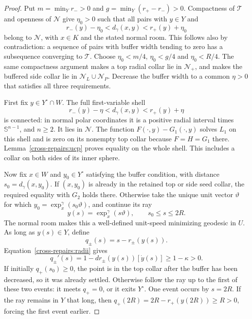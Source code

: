 \documentclass[11pt]{article}
\theoremstyle{definition}
\theoremstyle{remark}
\numberwithin{equation}{section}
\begin{document}
\begin{proof}
Put $m=\min_Yr_->0$ and $g=\min_Y(r_+-r_-)>0$.
Compactness of $\mathcal T$ and openness of $\mathcal N$ give
$\eta_0>0$ such that all pairs with $y\in Y$ and
\begin{equation}\label{cross-repairs:buffer}
 r_-(y)-\eta_0<d_\gamma(x,y)<r_+(y)+\eta_0
\end{equation}
belong to $\mathcal N$, with $x\in K$ and the stated normal room.
This follows also by contradiction: a sequence of pairs with buffer
width tending to zero has a subsequence converging to $\mathcal T$.
Choose $\eta_0<m/4$, $\eta_0<g/4$ and $\eta_0<R/4$.
The same compactness argument makes a top radial collar lie in
$\mathcal N_+$, and makes the buffered side collar lie in
$\mathcal N_L\cup\mathcal N_P$. Decrease the buffer width to a common
$\eta>0$ that satisfies all three requirements.

First fix $y\in Y^\circ\cap W$. The full first-variable shell
\[
 r_-(y)-\eta<d_\gamma(x,y)<r_+(y)+\eta
\]
is connected: in normal polar coordinates it is a positive radial
interval times $\mathbb S^{n-1}$, and $n\ge2$.
It lies in $\mathcal N$. The function $F(\cdot,y)-G_1(\cdot,y)$ solves
$L_1$ on this shell and is zero on its nonempty top collar because
$F=H=G_1$ there. Lemma~\ref{cross-repairs:ucp} proves equality on the
whole shell. This includes a collar on both sides of its inner sphere.

Now fix $x\in W$ and $y_0\in Y^\circ$ satisfying the buffer condition,
with distance $s_0=d_\gamma(x,y_0)$.
If $(x,y_0)$ is already in the retained top or side seed collar, the
required equality with $G_2$ holds there. Otherwise take the unique
unit vector $\vartheta$ for which
$y_0=\exp_x^\gamma(s_0\vartheta)$, and continue its ray
\[
 y(s)=\exp_x^\gamma(s\vartheta),\qquad s_0\le s\le2R.
\]
The normal room makes this a well-defined unit-speed minimizing
geodesic in $U$. As long as $y(s)\in Y$, define
\[
 q_\pm(s)=s-r_\pm(y(s)).
\]
Equation~\eqref{cross-repairs:radii} gives
\begin{equation}\label{cross-repairs:ray-monotone}
 q_\pm'(s)=1-dr_\pm(y(s))[\dot y(s)]\ge1-\kappa>0.
\end{equation}
If initially $q_+(s_0)\ge0$, the point is in the top collar after
the buffer has been decreased, so it was already settled.
Otherwise follow the ray up to the first of these two events:
it meets $q_+=0$, or it exits $Y^\circ$.
One event occurs by $s=2R$. If the ray remains in $Y$ that long,
then $q_+(2R)=2R-r_+(y(2R))\ge R>0$, forcing the first event earlier.


\end{proof}
\end{document}
